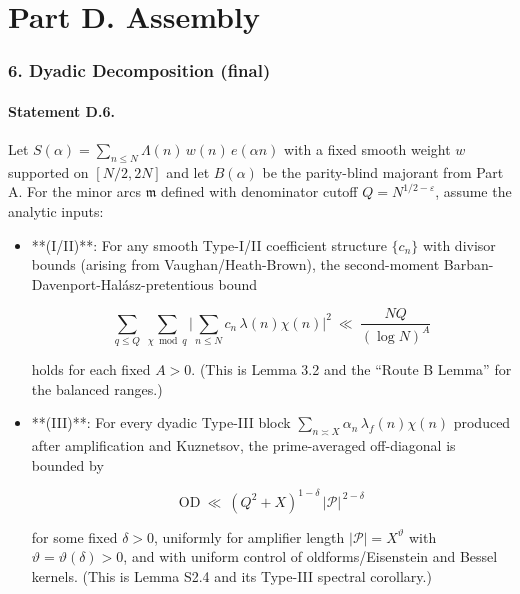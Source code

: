 \documentclass[11pt]{article}
\theoremstyle{definition}
\theoremstyle{remark}
\begin{document}
\part*{Part D. Assembly}

\section*{6. Dyadic Decomposition (final)}

\subsection*{Statement D.6.}

Let $S(\alpha)=\sum_{n\le N}\Lambda(n)\,w(n)\,e(\alpha n)$ with a fixed smooth weight $w$ supported on $[N/2,2N]$ and let $B(\alpha)$ be the parity-blind majorant from Part A. For the minor arcs $\mathfrak m$ defined with denominator cutoff $Q=N^{1/2-\varepsilon}$, assume the analytic inputs:

\begin{itemize}
	\item **(I/II)**: For any smooth Type-I/II coefficient structure $\{c_n\}$ with divisor bounds (arising from Vaughan/Heath-Brown), the second-moment Barban-Davenport-Halász-pretentious bound

	      \begin{equation}
		      \sum_{q\le Q}\ \sum_{\chi\bmod q}\Big|\sum_{n\le N} c_n\,\lambda(n)\chi(n)\Big|^2
		      \ \ll\ \frac{NQ}{(\log N)^A}
		      \tag{D.1}
	      \end{equation}

	      holds for each fixed $A>0$. (This is Lemma 3.2 and the “Route B Lemma” for the balanced ranges.)

	\item **(III)**: For every dyadic Type-III block $\sum_{n\asymp X}\alpha_n\,\lambda_f(n)\chi(n)$ produced after amplification and Kuznetsov, the prime-averaged off-diagonal is bounded by

	      \begin{equation}
		      \mathrm{OD}\ \ll\ (Q^2+X)^{1-\delta}\,|\mathcal P|^{\,2-\delta}
		      \tag{D.2}
	      \end{equation}

	      for some fixed $\delta>0$, uniformly for amplifier length $|\mathcal P|=X^\vartheta$ with $\vartheta=\vartheta(\delta)>0$, and with uniform control of oldforms/Eisenstein and Bessel kernels. (This is Lemma S2.4 and its Type-III spectral corollary.)
\end{itemize}
\end{document}
